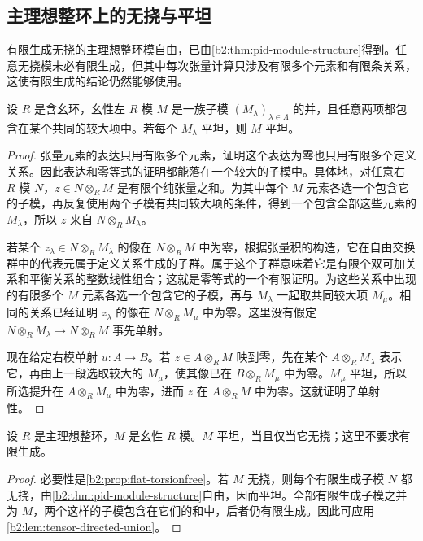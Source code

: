 \subsection{主理想整环上的无挠与平坦}
\label{b2:subsec:0703:03}

有限生成无挠的主理想整环模自由，已由\cref{b2:thm:pid-module-structure}得到。任意无挠模未必有限生成，但其中每次张量计算只涉及有限多个元素和有限条关系，这使有限生成的结论仍然能够使用。

\begin{lemma}\label{b2:lem:tensor-directed-union}
	设 \(R\) 是含幺环，幺性左 \(R\) 模 \(M\) 是一族子模 \((M_\lambda)_{\lambda\in\Lambda}\) 的并，且任意两项都包含在某个共同的较大项中。若每个 \(M_\lambda\) 平坦，则 \(M\) 平坦。
\end{lemma}
\begin{proof}
	张量元素的表达只用有限多个元素，证明这个表达为零也只用有限多个定义关系。因此表达和零等式的证明都能落在一个较大的子模中。具体地，对任意右 \(R\) 模 \(N\)，\(z\in N\otimes_RM\) 是有限个纯张量之和。为其中每个 \(M\) 元素各选一个包含它的子模，再反复使用两个子模有共同较大项的条件，得到一个包含全部这些元素的 \(M_\lambda\)，所以 \(z\) 来自 \(N\otimes_RM_\lambda\)。

	若某个 \(z_\lambda\in N\otimes_RM_\lambda\) 的像在 \(N\otimes_RM\) 中为零，根据张量积的构造，它在自由交换群中的代表元属于定义关系生成的子群。属于这个子群意味着它是有限个双可加关系和平衡关系的整数线性组合；这就是零等式的一个有限证明。为这些关系中出现的有限多个 \(M\) 元素各选一个包含它的子模，再与 \(M_\lambda\) 一起取共同较大项 \(M_\mu\)。相同的关系已经证明 \(z_\lambda\) 的像在 \(N\otimes_RM_\mu\) 中为零。这里没有假定 \(N\otimes_RM_\lambda\to N\otimes_RM\) 事先单射。

	现在给定右模单射 \(u:A\to B\)。若 \(z\in A\otimes_R M\) 映到零，先在某个 \(A\otimes_R M_\lambda\) 表示它，再由上一段选取较大的 \(M_\mu\)，使其像已在 \(B\otimes_R M_\mu\) 中为零。\(M_\mu\) 平坦，所以所选提升在 \(A\otimes_R M_\mu\) 中为零，进而 \(z\) 在 \(A\otimes_R M\) 中为零。这就证明了单射性。
\end{proof}

\begin{theorem}\label{b2:thm:pid-flat-torsionfree}
	设 \(R\) 是主理想整环，\(M\) 是幺性 \(R\) 模。\(M\) 平坦，当且仅当它无挠；这里不要求有限生成。
\end{theorem}
\begin{proof}
	必要性是\cref{b2:prop:flat-torsionfree}。若 \(M\) 无挠，则每个有限生成子模 \(N\) 都无挠，由\cref{b2:thm:pid-module-structure}自由，因而平坦。全部有限生成子模之并为 \(M\)，两个这样的子模包含在它们的和中，后者仍有限生成。因此可应用\cref{b2:lem:tensor-directed-union}。
\end{proof}


